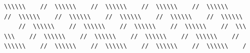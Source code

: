 \documentclass[aspectratio=169]{beamer}
\begin{document}
{\begin{verbatim}
\\\\\\    //  \\\\\\    //  \\\\\\    //  \\\\\\    //  \\\\\\    
//  \\\\\\    //  \\\\\\    //  \\\\\\    //  \\\\\\    //  \\\\\\
    //  \\\\\\    //  \\\\\\    //  \\\\\\    //  \\\\\\    //  \\\
\\\    //  \\\\\\    //  \\\\\\    //  \\\\\\    //  \\\\\\    //  
\\\\\\    //  \\\\\\    //  \\\\\\    //  \\\\\\    //  \\\\\\    /

\end{verbatim}}
\end{document}
